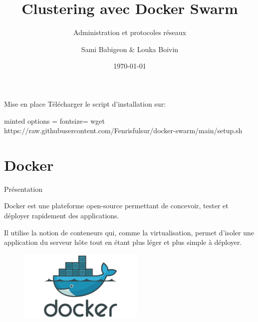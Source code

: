 \documentclass{cubeamer}
\title{Clustering avec Docker Swarm}
\subtitle{Administration et protocoles réseaux}
\author[Sami Babigeon \& Louka Boivin]{Sami Babigeon \& Louka Boivin}
\date{\today}
\institute[Université de Rouen]{Master 2 SSI}
\begin{document}

\maketitle

\begin{frame}[fragile]{Mise en place}
Télécharger le script d'installation sur:
\begin{bashWithOption}{minted options = {fontsize=\footnotesize}}
wget https://raw.githubusercontent.com/Fenrisfulsur/docker-swarm/main/setup.sh     
\end{bashWithOption}
\end{frame}

\cutoc

\section{Docker}

\begin{frame}{Présentation}
    \begin{multicols}{2}
    Docker est une plateforme open-source permettant de concevoir, tester et déployer rapidement
    des applications.
    
    Il utilise la notion de conteneurs qui, comme la virtualisation,
    permet d'isoler une application du serveur hôte tout en étant plus léger et plus simple à
    déployer.

    \columnbreak
    \begin{figure}
        \centering
        \includegraphics[width=6cm]{img/docker}
    \end{figure}    

    \end{multicols}
\end{frame}
\end{document}
